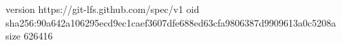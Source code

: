 version https://git-lfs.github.com/spec/v1
oid sha256:90a642a106295ecd9ec1caef3607dfe688ed63cfa9806387d9909613a0c5208a
size 626416
